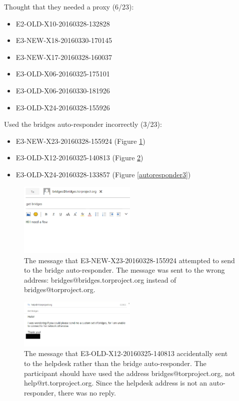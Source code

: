 \documentclass[USenglish,oneside,twocolumn]{article}
\begin{document}
Thought that they needed a proxy (6/23): 
\begin{itemize}
\item E2-OLD-X10-20160328-132828
\item E3-NEW-X18-20160330-170145
\item E3-NEW-X17-20160328-160037
\item E3-OLD-X06-20160325-175101
\item E3-OLD-X06-20160330-181926
\item E3-OLD-X24-20160328-155926
\end{itemize} 

Used the bridges auto-responder incorrectly (3/23): 
\begin{itemize}
\item E3-NEW-X23-20160328-155924 (Figure \ref{autoresponder1})
\item E3-OLD-X12-20160325-140813 (Figure \ref{autoresponder2})
\item E3-OLD-X24-20160328-133857 (Figure \ref{autoresponder3})
\end{itemize}   

\begin{figure}[h]
\label{autoresponder1}
\includegraphics[width=0.5\textwidth]{../experiment/processing/failed-participants/20160325-140813-bridgeresponder-redacted.png}
\caption{The message that E3-NEW-X23-20160328-155924 attempted to send to the bridge auto-responder. The message was sent to the wrong address: bridges@bridges.torproject.org instead of bridges@torproject.org.}
\end{figure} 

\begin{figure}[h]
\label{autoresponder2}
\includegraphics[width=0.5\textwidth]{../experiment/processing/failed-participants/20160328-133857-bridgeresponder-redacted.png}
\caption{The message that E3-OLD-X12-20160325-140813 accidentally sent to the helpdesk rather than the bridge auto-responder. The participant should have used the address bridges@torproject.org, not help@rt.torproject.org. Since the helpdesk address is not an auto-responder, there was no reply.}
\end{figure} 
\end{document}
